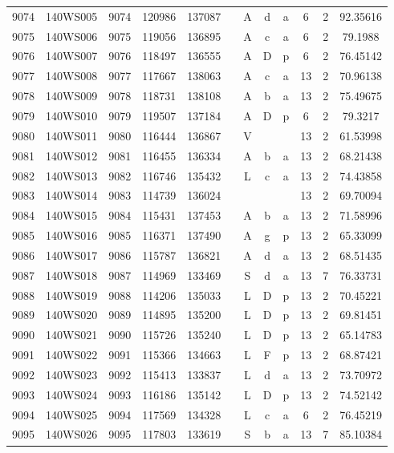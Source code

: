 \begin{tabular}{|*{12}{c|}}
9074 & 140WS005 & 9074 & 120986 & 137087 &  & A & d & a & 6 & 2 & 92.35616 \\ 
9075 & 140WS006 & 9075 & 119056 & 136895 &  & A & c & a & 6 & 2 & 79.1988 \\ 
9076 & 140WS007 & 9076 & 118497 & 136555 &  & A & D & p & 6 & 2 & 76.45142 \\ 
9077 & 140WS008 & 9077 & 117667 & 138063 &  & A & c & a & 13 & 2 & 70.96138 \\ 
9078 & 140WS009 & 9078 & 118731 & 138108 &  & A & b & a & 13 & 2 & 75.49675 \\ 
9079 & 140WS010 & 9079 & 119507 & 137184 &  & A & D & p & 6 & 2 & 79.3217 \\ 
9080 & 140WS011 & 9080 & 116444 & 136867 &  & V &  &  & 13 & 2 & 61.53998 \\ 
9081 & 140WS012 & 9081 & 116455 & 136334 &  & A & b & a & 13 & 2 & 68.21438 \\ 
9082 & 140WS013 & 9082 & 116746 & 135432 &  & L & c & a & 13 & 2 & 74.43858 \\ 
9083 & 140WS014 & 9083 & 114739 & 136024 &  &  &  &  & 13 & 2 & 69.70094 \\ 
9084 & 140WS015 & 9084 & 115431 & 137453 &  & A & b & a & 13 & 2 & 71.58996 \\ 
9085 & 140WS016 & 9085 & 116371 & 137490 &  & A & g & p & 13 & 2 & 65.33099 \\ 
9086 & 140WS017 & 9086 & 115787 & 136821 &  & A & d & a & 13 & 2 & 68.51435 \\ 
9087 & 140WS018 & 9087 & 114969 & 133469 &  & S & d & a & 13 & 7 & 76.33731 \\ 
9088 & 140WS019 & 9088 & 114206 & 135033 &  & L & D & p & 13 & 2 & 70.45221 \\ 
9089 & 140WS020 & 9089 & 114895 & 135200 &  & L & D & p & 13 & 2 & 69.81451 \\ 
9090 & 140WS021 & 9090 & 115726 & 135240 &  & L & D & p & 13 & 2 & 65.14783 \\ 
9091 & 140WS022 & 9091 & 115366 & 134663 &  & L & F & p & 13 & 2 & 68.87421 \\ 
9092 & 140WS023 & 9092 & 115413 & 133837 &  & L & d & a & 13 & 2 & 73.70972 \\ 
9093 & 140WS024 & 9093 & 116186 & 135142 &  & L & D & p & 13 & 2 & 74.52142 \\ 
9094 & 140WS025 & 9094 & 117569 & 134328 &  & L & c & a & 6 & 2 & 76.45219 \\ 
9095 & 140WS026 & 9095 & 117803 & 133619 &  & S & b & a & 13 & 7 & 85.10384 \\ 

\end{tabular}
